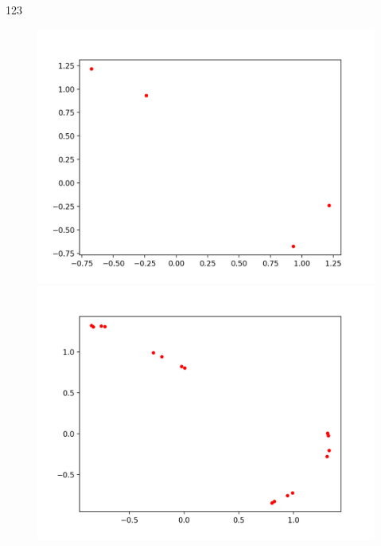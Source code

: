 \documentclass[12pt]{article}
\theoremstyle{plain}
\begin{document}
123\\[3ex] %
\begin{figure}[H]
\begin{minipage}[c][0.32\width]{0.32\textwidth}
   \centering
   \includegraphics[width=\textwidth]{figure/section2/Henon-attractor-0*9-0*4.png}
\end{minipage}
\begin{minipage}[c][0.32\width]{0.32\textwidth}
   \centering
   \includegraphics[width=\textwidth]{figure/section2/Henon-attractor-0*988-0*4.png}
\end{minipage}
\begin{minipage}[c][0.32\width]{0.32\textwidth}
   \centering

\end{minipage}
\end{figure}
\end{document}
